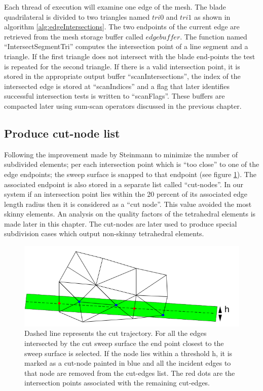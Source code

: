 Each thread of execution will examine one edge of the mesh. The blade quadrilateral is divided to two triangles named $tri0$ and $tri1$ 
as shown in algorithm \ref{alg:edgeIntersections}. The two endpoints of the current edge are retrieved from the mesh storage buffer called 
$edgebuffer$. The function named ``IntersectSegmentTri'' computes the intersection point of a line segment and a triangle. If the
first triangle does not intersect with the blade end-points the test is repeated for the second triangle. If there is a
valid intersection point, it is stored in the appropriate output buffer ``scanIntersections'', the index of the intersected edge is stored at
``scanIndices'' and a flag that later identifies successful intersection tests is written to ``scanFlags''. These buffers are compacted later 
using sum-scan operators discussed in the previous chapter. 


\subsection{Produce cut-node list}
Following the improvement made by Steinmann \etal \cite{Steinemann} to minimize the number of subdivided elements; 
per each intersection point which is ``too close'' to one of the edge endpoints; 
the sweep surface is snapped to that endpoint (see figure \ref{fig:cutnode}). The associated endpoint is also stored in a separate list called ``cut-nodes''. 
In our system if an intersection point lies within the 20 percent of its associated edge length radius then it is considered 
as a ``cut node''. This value avoided the most skinny elements. An analysis on the quality factors of the tetrahedral elements 
is made later in this chapter. The cut-nodes are later used to produce special subdivision cases which output non-skinny 
tetrahedral elements.

\begin{figure}[H]
  \centering
  \includegraphics[width=0.8\linewidth]{figures/cutting/cutnode.png}
  \caption{\label{fig:cutnode}
  {Dashed line represents the cut trajectory. For all the edges intersected by the cut sweep surface the end point closest to the sweep surface is selected.
  If the node lies within a threshold h, it is marked as a cut-node painted in blue and all the incident edges to that node are removed from the cut-edges list.
  The red dots are the intersection points associated with the remaining cut-edges.}
}
\end{figure}

